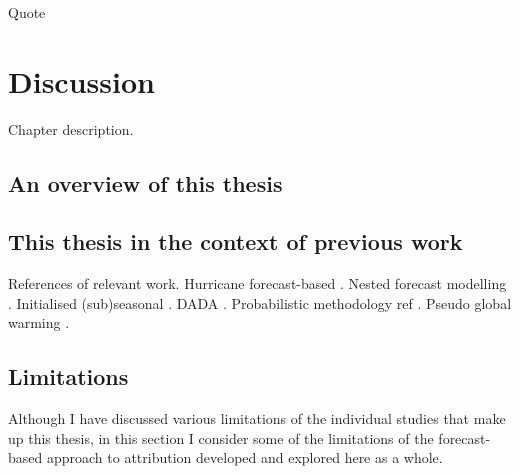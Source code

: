 \begin{savequote}[8cm]
    Quote
\end{savequote}
    
\chapter{\label{discussion}Discussion} 

Chapter description.

\minitoc

\clearpage

\section{An overview of this thesis}

  \blindtext

\section{This thesis in the context of previous work}

  References of relevant work. Hurricane forecast-based \citep{reed_attribution_2022,reed_forecasted_2020,patricola_anthropogenic_2018,lackmann_hurricane_2015}. Nested forecast modelling \citep{schaller_role_2020,meredith_crucial_2015}. Initialised (sub)seasonal \citep{hope_contributors_2015,hope_what_2016,hope_determining_2019,hope_subseasonal_2022,wang_initialized_2021,tradowsky_toward_2022,stone_effect_2022}. DADA \citep{hannart_dada_2016}. Probabilistic methodology ref \citep{pall_anthropogenic_2011}. Pseudo global warming \citep{schar_surrogate_1996}.

\section{Limitations}

  Although I have discussed various limitations of the individual studies that make up this thesis, in this section I consider some of the limitations of the forecast-based approach to attribution developed and explored here as a whole.

